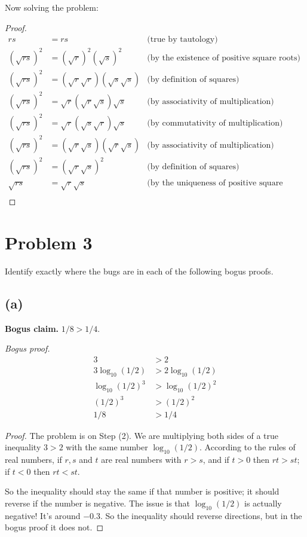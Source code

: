 \documentclass[14pt]{extarticle}
\begin{document}
Now solving the problem:
\begin{proof}
\begin{align*}
rs & = rs &\text{(true by tautology)}\\
(\sqrt{rs})^2 & =  (\sqrt{r})^2(\sqrt{s})^2 &\text{(by the existence of positive square roots)}\\
(\sqrt{rs})^2 & = (\sqrt{r}\sqrt{r})(\sqrt{s}\sqrt{s}) &\text{(by definition of squares)}\\
(\sqrt{rs})^2 & = \sqrt{r}(\sqrt{r}\sqrt{s})\sqrt{s} &\text{(by associativity of multiplication)}\\
(\sqrt{rs})^2 & = \sqrt{r}(\sqrt{s}\sqrt{r})\sqrt{s} &\text{(by commutativity of multiplication)}\\
(\sqrt{rs})^2 & = (\sqrt{r}\sqrt{s})(\sqrt{r}\sqrt{s}) &\text{(by associativity of multiplication)}\\
(\sqrt{rs})^2 & = (\sqrt{r}\sqrt{s})^2 &\text{(by definition of squares)}\\
\sqrt{rs} &=  \sqrt{r}\sqrt{s}  &\text{(by the uniqueness of positive square roots)}\\
\end{align*}
\end{proof}

\section{Problem 3}

Identify exactly where the bugs are in each of the following bogus proofs.

\subsection{(a)}

{\bf Bogus claim.} $1/8 > 1/4$.

{\it Bogus proof.}
\begin{align}
3 & > 2 \\
3\log_{10}(1/2) & > 2\log_{10}(1/2)\\
\log_{10}(1/2)^3 & > \log_{10}(1/2)^2\\
(1/2)^3 &> (1/2)^2 \\
1/8 &> 1/4
\end{align}

\begin{proof}
The problem is on Step (2). We are multiplying both sides of a true inequality $3 > 2$ with the same number $\log_{10}(1/2)$. According to the rules of real numbers, if $r, s$ and $t$ are real numbers with $r > s$, and if $t > 0$ then $rt > st$; if $t < 0$ then $rt < st$. 

So the inequality should stay the same if that number is positive; it should reverse if the number is negative. The issue is that $\log_{10}(1/2)$ is actually negative! It's around $-0.3$. So the inequality should reverse directions, but in the bogus proof it does not.
\end{proof}
\end{document}
